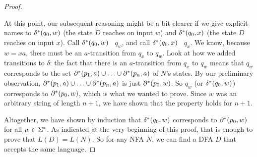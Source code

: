 \begin{proof}
\begin{enumerate}
At this point, our subsequent reasoning might be a bit clearer if we give
explicit names
to $\delta^*(q_0,w)$ (the state $D$
reaches on input $w$) and $\delta^*(q_0,x)$ (the state $D$
reaches on input $x$).  Call $\delta^*(q_0, w)$  \ $q_w$, and call
$\delta^*(q_0,x)$ \ $q_x$.  We know, because $w=xa$, there must be an 
$a$-transition from $q_x$ to $q_w$.  Look at how we added transitions to
$\delta$: the fact that there is an $a$-transition from $q_x$ to $q_w$ means that
$q_w$ corresponds to the set $\partial^*(p_1,a)
\cup \ldots \cup \partial^*(p_n,a)$ of $N$'s states.  By our preliminary observation,
$\partial^*(p_1,a)
\cup \ldots \cup \partial^*(p_n,a)$ is just $\partial^*(p_0,w)$.  So $q_w$ (or
$\delta^*(q_0,w)$) corresponds to $\partial^*(p_0,w)$, which is what we wanted to
prove.  Since $w$ was an arbitrary string of length $n+1$, we have shown that 
the property holds for $n+1$.
\end{enumerate}

Altogether, we have shown by induction that $\delta^*(q_0,w)$ corresponds to
$\partial^*(p_0,w)$ for all
$w \in \Sigma^*$.  As indicated at the very beginning of this proof, that is enough to
prove that $L(D)= L(N)$.  So for any NFA $N$, we can find a DFA $D$ that accepts
the same language.
\end{proof}

\bigskip

